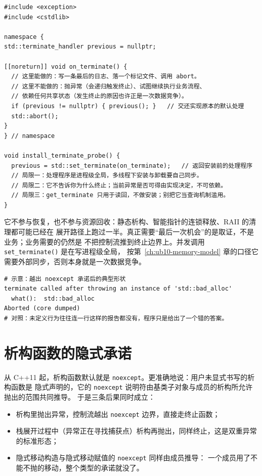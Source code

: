 \documentclass[12pt,a4paper,fontset=fandol]{ctexbook}
\newcommand{\cpp}[1]{C++#1}
\newcommand{\Fn}[1]{\texttt{#1()}}
\newcommand{\Tp}[1]{\texttt{#1}}
\newcommand{\Bk}{\discretionary{}{}{}}
\begin{document}
\begin{lstlisting}[style=cppstyle, caption={终止处理程序：只能报告，不能恢复}]
#include <exception>
#include <cstdlib>

namespace {
std::terminate_handler previous = nullptr;

[[noreturn]] void on_terminate() {
  // 这里能做的：写一条最后的日志、落一个标记文件、调用 abort。
  // 这里不能做的：抛异常（会递归触发终止）、试图继续执行业务流程、
  // 依赖任何共享状态（发生终止的原因也许正是一次数据竞争）。
  if (previous != nullptr) { previous(); }   // 交还实现原本的默认处理
  std::abort();
}
} // namespace

void install_terminate_probe() {
  previous = std::set_terminate(on_terminate);   // 返回安装前的处理程序
  // 局限一：处理程序是进程级全局，多线程下安装与卸载要自己同步。
  // 局限二：它不告诉你为什么终止；当前异常是否可得由实现决定，不可依赖。
  // 局限三：get_terminate 只用于读回，不做安装；别把它当查询机制滥用。
}
\end{lstlisting}

\begin{note}[title={别把终止处理程序当作兜底}]
它不参与恢复，也不参与资源回收：静态析构、智能指针的连锁释放、RAII 的清理都可能已经在
展开路径上跑过一半。真正需要“最后一次机会”的是取证，不是业务；业务需要的仍然是
不把控制流推到终止边界上。并发调用 \Fn{set{\Bk}\_terminate} 是在写进程级全局，
按第~\ref{ch:ub10-memory-model} 章的口径它需要外部同步，否则本身就是一次数据竞争。
\end{note}

\begin{lstlisting}[style=outstyle, caption={一次终止的报告形状（示意排版，非本仓库实测输出）}]
# 示意：越出 noexcept 承诺后的典型形状
terminate called after throwing an instance of 'std::bad_alloc'
  what():  std::bad_alloc
Aborted (core dumped)
# 对照：未定义行为往往连一行这样的报告都没有，程序只是给出了一个错的答案。
\end{lstlisting}

\section{析构函数的隐式承诺}\label{sec:ub11-dtor-noexcept}

从 \cpp{11} 起，析构函数默认就是 \Tp{noexcept}。更准确地说：用户未显式书写的析构函数是
隐式声明的，它的 \Tp{noexcept} 说明符由基类子对象与成员的析构所允许抛出的范围共同推导。
于是三条后果同时成立：

\begin{itemize}
  \item 析构里抛出异常，控制流越出 \Tp{noexcept} 边界，直接走终止函数；
  \item 栈展开过程中（异常正在寻找捕获点）析构再抛出，同样终止，这是双重异常的标准形态；
  \item 隐式移动构造与隐式移动赋值的 \Tp{noexcept} 同样由成员推导：
        一个成员用了不能不抛的移动，整个类型的承诺就没了。
\end{itemize}
\end{document}
